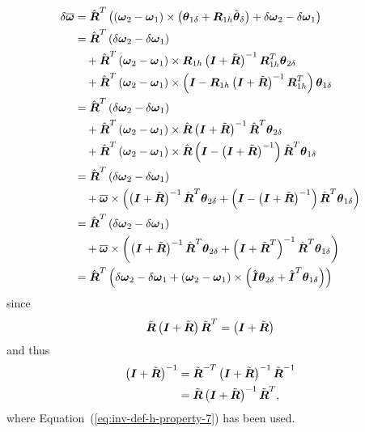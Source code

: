 \documentclass[10pt,dvips,fleqn,subeqn]{report}
\newcommand{\T}[1]{\boldsymbol{#1}}
\begin{document}
\begin{align}
	\delta\overline{\T{\omega}}
	&= \hat{\T{R}}^T \plbr{
		\plbr{\T{\omega}_2 - \T{\omega}_1} \times \plbr{\T{\theta}_{1\delta} + \T{R}_{1h} \tilde{\T{\theta}}_{\delta}}
		+ \delta\T{\omega}_2 - \delta\T{\omega}_1
	} \\
	&= \hat{\T{R}}^T \plbr{
		\delta\T{\omega}_2 - \delta\T{\omega}_1
	} \nonumber \\
	& \mbox{\hspace{10pt}} + \hat{\T{R}}^T \plbr{\T{\omega}_2 - \T{\omega}_1} \times 
			\T{R}_{1h}\plbr{\T{I} + \tilde{\T{R}}}^{-1} \T{R}_{1h}^T \T{\theta}_{2\delta} \nonumber \\
	& \mbox{\hspace{10pt}} + \hat{\T{R}}^T \plbr{\T{\omega}_2 - \T{\omega}_1} \times
			\plbr{\T{I} - \T{R}_{1h}\plbr{\T{I} + \tilde{\T{R}}}^{-1} \T{R}_{1h}^T} \T{\theta}_{1\delta} \\
	&= \hat{\T{R}}^T \plbr{
		\delta\T{\omega}_2 - \delta\T{\omega}_1
	} \nonumber \\
	& \mbox{\hspace{10pt}} + \hat{\T{R}}^T \plbr{\T{\omega}_2 - \T{\omega}_1} \times 
			\hat{\T{R}}\plbr{\T{I} + \tilde{\T{R}}}^{-1} \hat{\T{R}}^T \T{\theta}_{2\delta} \nonumber \\
	& \mbox{\hspace{10pt}} + \hat{\T{R}}^T \plbr{\T{\omega}_2 - \T{\omega}_1} \times
			\hat{\T{R}}\plbr{\T{I} - \plbr{\T{I} + \tilde{\T{R}}}^{-1}} \hat{\T{R}}^T \T{\theta}_{1\delta} \\
	&= \hat{\T{R}}^T \plbr{
		\delta\T{\omega}_2 - \delta\T{\omega}_1
	} \nonumber \\
	& \mbox{\hspace{10pt}} + \overline{\T{\omega}} \times \plbr{
		\plbr{\T{I} + \tilde{\T{R}}}^{-1} \hat{\T{R}}^T \T{\theta}_{2\delta}
		+ \plbr{\T{I} - \plbr{\T{I} + \tilde{\T{R}}}^{-1}} \hat{\T{R}}^T \T{\theta}_{1\delta}
	} \\
	&= \hat{\T{R}}^T \plbr{
		\delta\T{\omega}_2 - \delta\T{\omega}_1
	} \nonumber \\
	& \mbox{\hspace{10pt}} + \overline{\T{\omega}} \times \plbr{
		\plbr{\T{I} + \tilde{\T{R}}}^{-1} \hat{\T{R}}^T \T{\theta}_{2\delta}
		+ \plbr{\T{I} + \tilde{\T{R}}^T}^{-1} \hat{\T{R}}^T \T{\theta}_{1\delta}
	} \\
	&= \hat{\T{R}}^T \plbr{
		\delta\T{\omega}_2 - \delta\T{\omega}_1
	+ \plbr{\T{\omega}_2 - \T{\omega}_1} \times \plbr{
		\hat{\T{I}} \T{\theta}_{2\delta}
		+ \hat{\T{I}}^T \T{\theta}_{1\delta}
	}}
	\label{eq:inv-deformable-hinge-omega-rel-delta}
\end{align}
since
\begin{equation}
	\tilde{\T{R}}\plbr{\T{I} + \tilde{\T{R}}} \tilde{\T{R}}^T = \plbr{\T{I} + \tilde{\T{R}}}
\end{equation}
and thus
\begin{align}
	\plbr{\T{I} + \tilde{\T{R}}}^{-1}
	&= \tilde{\T{R}}^{-T} \plbr{\T{I} + \tilde{\T{R}}}^{-1} \tilde{\T{R}}^{-1} \\
	&= \tilde{\T{R}} \plbr{\T{I} + \tilde{\T{R}}}^{-1} \tilde{\T{R}}^T ,
\end{align}
where Equation~(\ref{eq:inv-def-h-property-7}) has been used.
\end{document}
